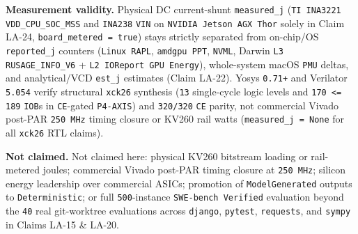 \documentclass[10pt]{article}
\begin{document}
\textbf{Measurement validity.} Physical DC current-shunt \texttt{measured\_j} (\texttt{TI INA3221} \texttt{VDD\_CPU\_SOC\_MSS} and \texttt{INA238} \texttt{VIN} on \texttt{NVIDIA Jetson AGX Thor} solely in Claim LA-24, \texttt{board\_metered = true}) stays strictly separated from on-chip/OS \texttt{reported\_j} counters (\texttt{Linux RAPL}, \texttt{amdgpu PPT}, \texttt{NVML}, Darwin \texttt{L3 RUSAGE\_INFO\_V6} + \texttt{L2 IOReport GPU Energy}), whole-system macOS \texttt{PMU} deltas, and analytical/VCD \texttt{est\_j} estimates (Claim LA-22). Yosys \texttt{0.71+} and Verilator \texttt{5.054} verify structural \texttt{xck26} synthesis (\texttt{13} single-cycle logic levels and \texttt{170 <= 189} \texttt{IOB}s in \texttt{CE}-gated \texttt{P4-AXIS}) and \texttt{320/320} \texttt{CE} parity, not commercial Vivado post-PAR \texttt{250 MHz} timing closure or KV260 rail watts (\texttt{measured\_j = None} for all \texttt{xck26} RTL claims).

\textbf{Not claimed.} Not claimed here: physical KV260 bitstream loading or rail-metered joules; commercial Vivado post-PAR timing closure at \texttt{250 MHz}; silicon energy leadership over commercial ASICs; promotion of \texttt{ModelGenerated} outputs to \texttt{Deterministic}; or full \texttt{500}-instance \texttt{SWE-bench Verified} evaluation beyond the \texttt{40} real git-worktree evaluations across \texttt{django}, \texttt{pytest}, \texttt{requests}, and \texttt{sympy} in Claims LA-15 \& LA-20.
\end{document}
